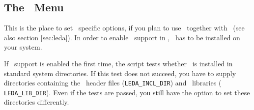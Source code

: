 
\subsection{The \leda\ Menu}\label{sec:leda-menu}

This is the place to set \leda\ specific options, if you plan to use
\leda\ together with \cgal\ (see also section \ref{sec:leda}). In
order to enable \leda\ support in \cgal, \leda\ has to be installed on
your system.

If \leda\ support is enabled the first time, the script tests whether
\leda\ is installed in standard system directories. If this test does
not succeed, you have to supply directories containing the \leda\ 
header files (\texttt{LEDA\_INCL\_DIR}) and \leda\ libraries ({\tt
  LEDA\_LIB\_DIR}).  Even if the tests are passed, you still have the
option to set these directories differently.\bigskip

